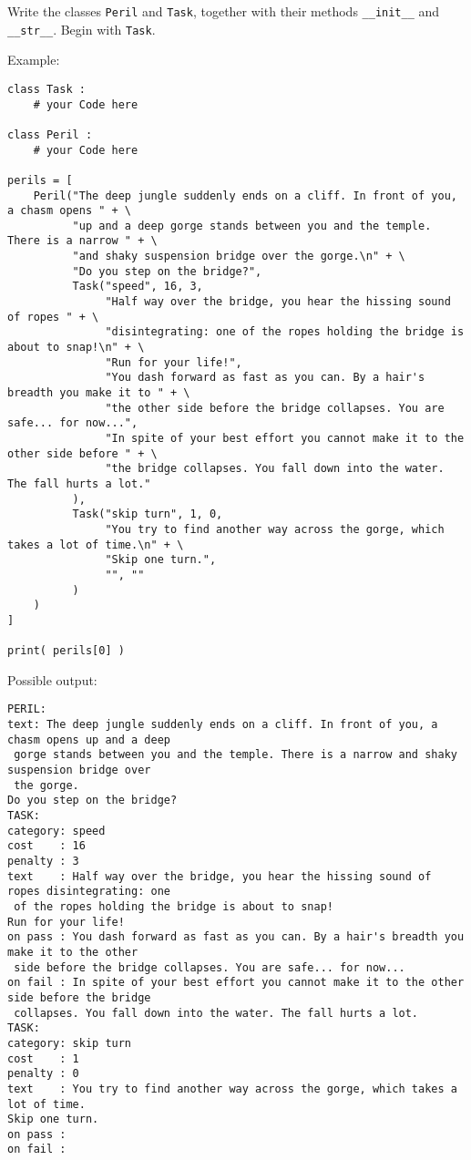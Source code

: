 \documentclass[
	english,
	fontsize=10pt,
	parskip=half,
	titlepage=true,
	DIV=12
]{scrartcl}
\newcommand*{\inPy}[1]{\texttt{#1}}
\begin{document}
Write the classes \texttt{Peril} and \texttt{Task}, together with their methods \inPy{__init__} and \inPy{__str__}. Begin with \texttt{Task}.

Example:
\begin{verbatim}
class Task :
    # your Code here
    
class Peril :
    # your Code here

perils = [
    Peril("The deep jungle suddenly ends on a cliff. In front of you, a chasm opens " + \
          "up and a deep gorge stands between you and the temple. There is a narrow " + \
          "and shaky suspension bridge over the gorge.\n" + \
          "Do you step on the bridge?",
          Task("speed", 16, 3,
               "Half way over the bridge, you hear the hissing sound of ropes " + \
               "disintegrating: one of the ropes holding the bridge is about to snap!\n" + \
               "Run for your life!",
               "You dash forward as fast as you can. By a hair's breadth you make it to " + \
               "the other side before the bridge collapses. You are safe... for now...",
               "In spite of your best effort you cannot make it to the other side before " + \
               "the bridge collapses. You fall down into the water. The fall hurts a lot."
          ),
          Task("skip turn", 1, 0,
               "You try to find another way across the gorge, which takes a lot of time.\n" + \
               "Skip one turn.",
               "", ""
          )
    )
]

print( perils[0] )
\end{verbatim}

Possible output:
\begin{verbatim}
PERIL:
text: The deep jungle suddenly ends on a cliff. In front of you, a chasm opens up and a deep
 gorge stands between you and the temple. There is a narrow and shaky suspension bridge over
 the gorge.
Do you step on the bridge?
TASK:
category: speed
cost    : 16
penalty : 3
text    : Half way over the bridge, you hear the hissing sound of ropes disintegrating: one
 of the ropes holding the bridge is about to snap!
Run for your life!
on pass : You dash forward as fast as you can. By a hair's breadth you make it to the other
 side before the bridge collapses. You are safe... for now...
on fail : In spite of your best effort you cannot make it to the other side before the bridge
 collapses. You fall down into the water. The fall hurts a lot.
TASK:
category: skip turn
cost    : 1
penalty : 0
text    : You try to find another way across the gorge, which takes a lot of time.
Skip one turn.
on pass : 
on fail : 
\end{verbatim}
\end{document}
